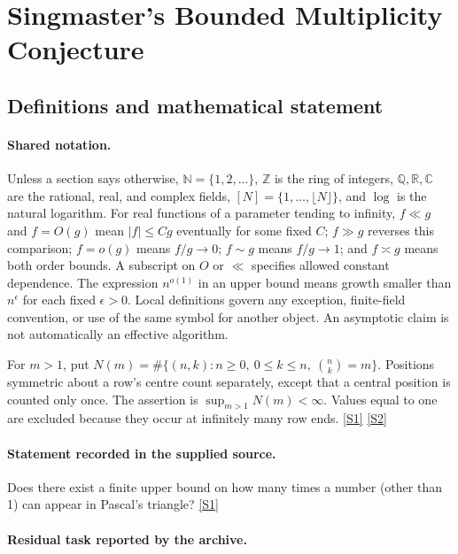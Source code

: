 \documentclass[11pt,a4paper]{article}
\newcommand{\N}{\mathbb{N}}
\newcommand{\Z}{\mathbb{Z}}
\newcommand{\Q}{\mathbb{Q}}
\newcommand{\R}{\mathbb{R}}
\newcommand{\C}{\mathbb{C}}
\newcommand{\sref}[2]{\hyperlink{source:#1:#2}{[S#2]}}
\begin{document}
\section{Singmaster's Bounded Multiplicity Conjecture}\label{statement}


\subsection{Definitions and mathematical statement}

\paragraph{Shared notation.}Unless a section says otherwise, $\N=\{1,2,\ldots\}$,
$\Z$ is the ring of integers, $\Q,\R,\C$ are the rational, real, and complex
fields, $[N]=\{1,\ldots,\lfloor N\rfloor\}$, and $\log$ is the natural
logarithm. For real functions of a parameter tending to infinity,
$f\ll g$ and $f=O(g)$ mean $|f|\leq Cg$ eventually for some fixed $C$;
$f\gg g$ reverses this comparison; $f=o(g)$ means $f/g\to0$;
$f\sim g$ means $f/g\to1$; and $f\asymp g$ means both order bounds.
A subscript on $O$ or $\ll$ specifies allowed constant dependence.
The expression $n^{o(1)}$ in an upper bound means growth smaller than
$n^\epsilon$ for each fixed $\epsilon>0$. Local definitions govern any
exception, finite-field convention, or use of the same symbol for another
object. An asymptotic claim is not automatically an effective algorithm.



For $m>1$, put $N(m)=\#\{(n,k):n\geq0,\ 0\leq k\leq n,\ \binom nk=m\}$. Positions symmetric about a row's centre count separately, except that a central position is counted only once. The assertion is $\sup_{m>1}N(m)<\infty$. Values equal to one are excluded because they occur at infinitely many row ends. \sref{statement}{1} \sref{statement}{2}

\paragraph{Statement recorded in the supplied source.}
Does there exist a finite upper bound on how many times a number (other than 1) can appear in Pascal's triangle? \sref{statement}{1}

\paragraph{Residual task reported by the archive.}
\end{document}
